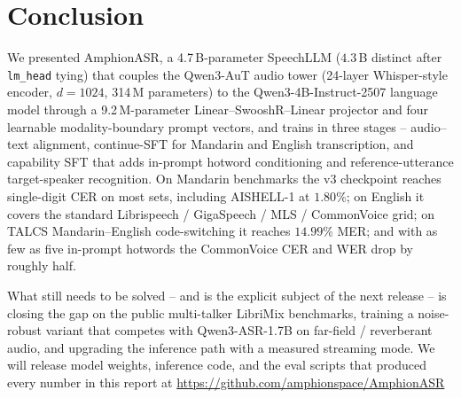 \section{Conclusion}
\label{sec:conclusion}

We presented AmphionASR, a 4.7\,B-parameter SpeechLLM ($4.3$\,B
distinct after \texttt{lm\_head} tying) that couples the Qwen3-AuT
audio tower (24-layer Whisper-style encoder, $d{=}1024$, 314\,M
parameters) to the Qwen3-4B-Instruct-2507 language model through a
9.2\,M-parameter Linear--SwooshR--Linear projector and four learnable
modality-boundary prompt vectors, and trains in three stages --
audio--text alignment, continue-SFT for Mandarin and English
transcription, and capability SFT that adds in-prompt hotword
conditioning and reference-utterance target-speaker recognition. On Mandarin benchmarks the v3 checkpoint
reaches single-digit CER on most sets, including AISHELL-1 at
$1.80$\%; on English it covers the standard Librispeech / GigaSpeech /
MLS / CommonVoice grid; on TALCS Mandarin--English code-switching it
reaches $14.99$\% MER; and with as few as five in-prompt hotwords the
CommonVoice CER and WER drop by roughly half.

What still needs to be solved -- and is the explicit subject of the
next release -- is closing the gap on the public multi-talker LibriMix
benchmarks, training a noise-robust variant that competes with
Qwen3-ASR-1.7B on far-field / reverberant audio, and upgrading the
inference path with a measured streaming mode. We will release model
weights, inference code, and the eval scripts that produced every
number in this report at
\url{https://github.com/amphionspace/AmphionASR} %
